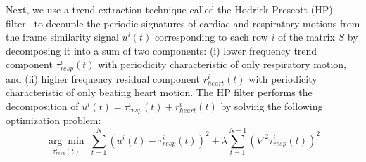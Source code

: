 \documentclass[journal]{IEEEtran}
\newcommand{\argmin}[1]{\underset{#1}{\operatorname{arg}\operatorname{min}}\;}
\begin{document}
Next, we use a trend extraction technique called the Hodrick-Prescott (HP) filter~\cite{Alexandrov2012} to decouple the periodic signatures of cardiac and respiratory motions from the frame similarity signal $u^i(t)$ corresponding to each row $i$ of the matrix $S$ by decomposing it into a sum of two components: (i) lower frequency trend component $\tau^i_{resp}(t)$ with periodicity characteristic of only respiratory motion, and (ii) higher frequency residual component $r^i_{heart}(t)$ with periodicity characteristic of only beating heart motion. The HP filter performs the decomposition of $u^i(t) = \tau^i_{resp}(t) + r^i_{heart}(t)$ by solving the following optimization problem:
\begin{equation}	
\argmin{\tau^i_{resp}(t)} \sum_{t=1}^{N}  \left(u^i(t) - \tau^i_{resp}(t) \right)^2  + \lambda \sum_{t=1}^{N-1} \left( \nabla^2 \tau^i_{resp}(t) \right)^2
\end{equation}
\end{document}
